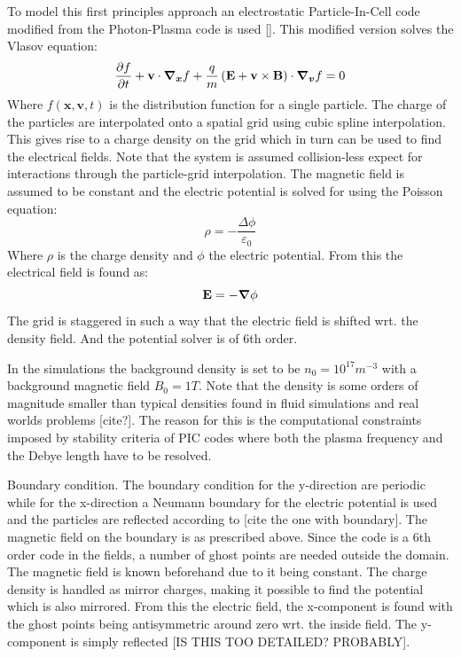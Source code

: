 \documentclass[9pt,twocolumn]{article}
\newcommand{\gv}[1]{\ensuremath{\mbox{\boldmath$ #1 $}}}
\newcommand{\fd}[1]{\mathbf{#1}}
\newcommand{\pd}[2]{\frac{\partial #1}{\partial #2}}
\newcommand{\grad}[1]{\gv{\nabla} #1} %
\renewcommand{\=}[1]{\stackrel{#1}{=}} %
\theoremstyle{definition}
\theoremstyle{remark}
\begin{document}
To model this first principles approach an electrostatic Particle-In-Cell code modified from the Photon-Plasma code is used []. This modified version solves the Vlasov equation:
\begin{equation}
\pd ft+\fd v\cdot\gv{\nabla_x}f+\frac{q}{m}\left(\fd E+\fd v\times\fd B\right)\cdot \gv{\nabla_v}f=0
\end{equation}
Where $f(\fd x, \fd v,t)$ is the distribution function for a single particle. The charge of the particles are interpolated onto a spatial grid using cubic spline interpolation. This gives rise to a charge density on the grid which in turn can be used to find the electrical fields. 
Note that the system is assumed collision-less expect for interactions through the particle-grid interpolation. The magnetic field is assumed to be constant and the electric potential is solved for using the Poisson equation:
\begin{equation}
\rho =-\frac{\Delta\phi}{\varepsilon_0}
\end{equation}
Where $\rho$ is the charge density and $\phi$ the electric potential. 
From this the electrical field is found as:
\begin{equation}
\fd E = -\grad \phi
\end{equation}
The grid is staggered in such a way that the electric field is shifted wrt. the density field. And the potential solver is of 6th order.


In the simulations the background density is set to be $n_0=10^{17}m^{-3}$ with a background magnetic field $B_0=1T$. Note that the density is some orders of magnitude smaller than typical densities found in fluid simulations and real worlds problems [cite?]. The reason for this is the computational constraints imposed by stability criteria of PIC codes where both the plasma frequency and the Debye length have to be resolved.




Boundary condition.
The boundary condition for the y-direction are periodic while for the x-direction a Neumann boundary for the electric potential is used and the particles are reflected according to [cite the one with boundary]. The magnetic field on the boundary is as prescribed above. Since the code is a 6th order code in the fields, a number of ghost points are needed outside the domain. The magnetic field is known beforehand due to it being constant.  The charge density is handled as mirror charges, making it possible to find the potential which is also mirrored. From this the electric field, the x-component is found with the ghost points being antisymmetric around zero wrt. the inside field. The y-component is simply reflected [IS THIS TOO DETAILED? PROBABLY].
\end{document}
